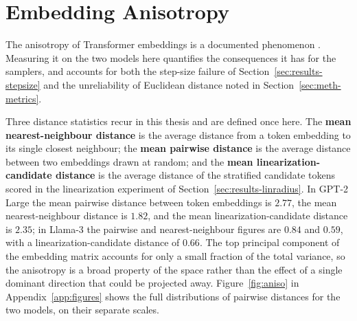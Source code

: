 \section{Embedding Anisotropy}
\label{sec:results-aniso}

The anisotropy of Transformer embeddings is a documented phenomenon \citep{gao2019representation, ethayarajh2019contextual}. Measuring it on the two models here quantifies the consequences it has for the samplers, and accounts for both the step-size failure of Section~\ref{sec:results-stepsize} and the unreliability of Euclidean distance noted in Section~\ref{sec:meth-metrics}.

Three distance statistics recur in this thesis and are defined once here. The \textbf{mean nearest-neighbour distance} is the average distance from a token embedding to its single closest neighbour; the \textbf{mean pairwise distance} is the average distance between two embeddings drawn at random; and the \textbf{mean linearization-candidate distance} is the average distance of the stratified candidate tokens scored in the linearization experiment of Section~\ref{sec:results-linradius}. In GPT-2 Large the mean pairwise distance between token embeddings is $2.77$, the mean nearest-neighbour distance is $1.82$, and the mean linearization-candidate distance is $2.35$; in Llama-3 the pairwise and nearest-neighbour figures are $0.84$ and $0.59$, with a linearization-candidate distance of $0.66$.
The top principal component of the embedding matrix accounts for only a small fraction of the total variance, so the anisotropy is a broad property of the space rather than the effect of a single dominant direction that could be projected away.
Figure~\ref{fig:aniso} in Appendix~\ref{app:figures} shows the full distributions of pairwise distances for the two models, on their separate scales.

